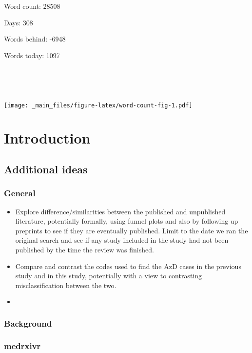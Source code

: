 \documentclass[a4paper, twoside]{templates/ociamthesis}
\begin{document}
\adjustmtc

Word count: 28508

Days: 308

Words behind: -6948

Words today: 1097

~

~

\texttt{[image: \_main\_files/figure-latex/word-count-fig-1.pdf]}



\hypertarget{intro-heading}{%
\chapter{Introduction}\label{intro-heading}}

\minitoc 

\hypertarget{additional-ideas}{%
\section{Additional ideas}\label{additional-ideas}}

\hypertarget{general}{%
\subsection{General}\label{general}}

\begin{itemize}
\item
  Explore difference/similarities between the published and unpublished literature, potentially formally, using funnel plots and also by following up preprints to see if they are eventually published. Limit to the date we ran the original search and see if any study included in the study had not been published by the time the review was finished.
\item
  Compare and contrast the codes used to find the AzD cases in the previous study and in this study, potentially with a view to contrasting misclassification between the two.
\item
\end{itemize}

\hypertarget{background}{%
\subsection{Background}\label{background}}

\hypertarget{medrxivr}{%
\subsection{medrxivr}\label{medrxivr}}
\end{document}
